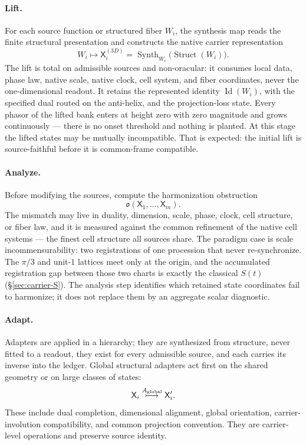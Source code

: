 \documentclass[11pt]{article}
\theoremstyle{definition}
\begin{document}
\paragraph{Lift.}
For each source function or structured fiber \(W_i\), the synthesis map reads
the finite structural presentation and constructs the native carrier
representation
\[
W_i\longmapsto \mathsf X_i^{(3D)}
=\operatorname{Synth}_{W_i}\bigl(\operatorname{Struct}(W_i)\bigr).
\]
The lift is total on admissible sources and non-oracular: it consumes local
data, phase law, native scale, native clock, cell system, and fiber
coordinates, never the one-dimensional readout.  It retains the represented
identity \(\operatorname{Id}(W_i)\), with the specified dual routed on the
anti-helix, and the projection-loss state.  Every phasor of the lifted bank
enters at height zero with zero magnitude and grows continuously --- there is
no onset threshold and nothing is planted.  At this stage the lifted states
may be mutually incompatible.  That is expected: the initial lift is
source-faithful before it is common-frame compatible.

\paragraph{Analyze.}
Before modifying the sources, compute the harmonization obstruction
\[
\mathfrak o(\mathsf X_1,\ldots,\mathsf X_m).
\]
The mismatch may live in duality, dimension, scale, phase, clock, cell
structure, or fiber law, and it is measured against the common refinement of
the native cell systems --- the finest cell structure all sources share.  The
paradigm case is scale incommensurability: two registrations of one
procession that never re-synchronize.  The \(\pi/3\) and unit-\(1\) lattices
meet only at the origin, and the accumulated registration gap between those
two charts is exactly the classical \(S(t)\) (\S\ref{sec:carrier-S}).  The
analysis step identifies which retained state coordinates fail to harmonize;
it does not replace them by an aggregate scalar diagnostic.

\paragraph{Adapt.}
Adapters are applied in a hierarchy; they are synthesized from structure,
never fitted to a readout, they exist for every admissible source, and each
carries its inverse into the ledger.  Global structural adapters act first on
the shared geometry or on large classes of states:
\[
\mathsf X_i
\overset{A_{\rm global}}{\longmapsto}
\mathsf X_i'.
\]
These include dual completion, dimensional alignment, global orientation,
carrier-involution compatibility, and common projection convention.  They are
carrier-level operations and preserve source identity.
\end{document}
